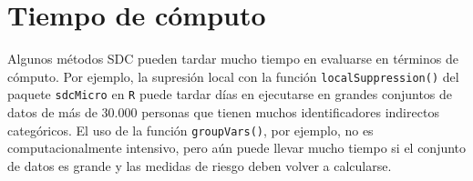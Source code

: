 \documentclass[
]{book}
\newenvironment{Shaded}{\begin{snugshade}}{\end{snugshade}}
\newcommand{\AttributeTok}[1]{\textcolor[rgb]{0.77,0.63,0.00}{#1}}
\newcommand{\CommentTok}[1]{\textcolor[rgb]{0.56,0.35,0.01}{\textit{#1}}}
\newcommand{\ConstantTok}[1]{\textcolor[rgb]{0.00,0.00,0.00}{#1}}
\newcommand{\ControlFlowTok}[1]{\textcolor[rgb]{0.13,0.29,0.53}{\textbf{#1}}}
\newcommand{\DecValTok}[1]{\textcolor[rgb]{0.00,0.00,0.81}{#1}}
\newcommand{\FunctionTok}[1]{\textcolor[rgb]{0.00,0.00,0.00}{#1}}
\newcommand{\NormalTok}[1]{#1}
\newcommand{\OtherTok}[1]{\textcolor[rgb]{0.56,0.35,0.01}{#1}}
\newcommand{\SpecialCharTok}[1]{\textcolor[rgb]{0.00,0.00,0.00}{#1}}
\newcommand{\StringTok}[1]{\textcolor[rgb]{0.31,0.60,0.02}{#1}}
\theoremstyle{definition}
\theoremstyle{definition}
\theoremstyle{definition}
\theoremstyle{definition}
\theoremstyle{remark}
\begin{document}
\begin{Shaded}
\end{Shaded}

\hypertarget{tiempo-de-cuxf3mputo}{%
\section{Tiempo de cómputo}\label{tiempo-de-cuxf3mputo}}

Algunos métodos SDC pueden tardar mucho tiempo en evaluarse en términos de cómputo. Por ejemplo, la supresión local con la función \texttt{localSuppression()} del paquete \texttt{sdcMicro} en \texttt{R} puede tardar días en ejecutarse en grandes conjuntos de datos de más de 30.000 personas que tienen muchos identificadores indirectos categóricos. El uso de la función \texttt{groupVars()}, por ejemplo, no es computacionalmente intensivo, pero aún puede llevar mucho tiempo si el conjunto de datos es grande y las medidas de riesgo deben volver a calcularse.
\end{document}
